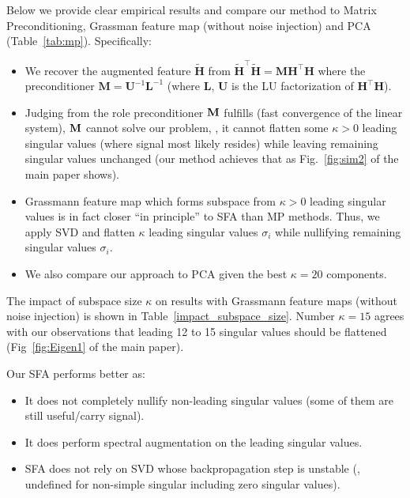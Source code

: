 Below we  provide clear empirical results and compare our method to Matrix Preconditioning, Grassman feature map (without noise injection) and PCA (Table~\ref{tab:mp}). Specifically: 
\begin{itemize}
    \item We recover the augmented feature $\tilde{\mathbf{H}}$ from $\tilde{\mathbf{H}}^\top \tilde{\mathbf{H}} = \mathbf{MH}^\top\mathbf{H}$ where the preconditioner $\mathbf{M} =\mathbf{U}^{-1} \mathbf{L}^{-1}$ (where $\mathbf{L}$, $\mathbf{U}$ is the LU factorization of $\mathbf{H}^\top\mathbf{H}$). 
    \item Judging from the role preconditioner ${\bf M}$ fulfills (fast convergence of the linear system), ${\bf M}$ cannot solve our problem, \ie, it cannot  flatten some $\kappa>0$ leading singular values (where signal most likely resides) while leaving remaining singular values unchanged (our method achieves that as Fig.~\ref{fig:sim2} of the main paper shows).
    \item Grassmann feature map which forms subspace from $\kappa>0$ leading singular values is in fact closer ``in principle'' to SFA than MP methods. Thus, we apply SVD and flatten $\kappa$ leading singular values $\sigma_i$ while nullifying remaining singular values $\sigma_i$. 
    \item We also compare our approach to PCA given the best $\kappa=20$ components.
\end{itemize}

The impact of subspace size $\kappa$ on results with Grassmann feature maps (without noise injection) is shown in Table~\ref{impact_subspace_size}. Number $\kappa=15$ agrees with our observations that leading 12 to 15 singular values should be flattened (Fig~\ref{fig:Eigen1} of the main paper). 

\vspace{0.2cm}
Our SFA performs better as:
\vspace{0.2cm}

\begin{itemize}
    \item It does not completely nullify non-leading singular values (some of them are still useful/carry signal).
    \item It does perform spectral augmentation on the leading singular values.
    \item  SFA does not rely on SVD whose backpropagation step is unstable (\eg, undefined for non-simple singular including zero singular values).
\end{itemize}
    
